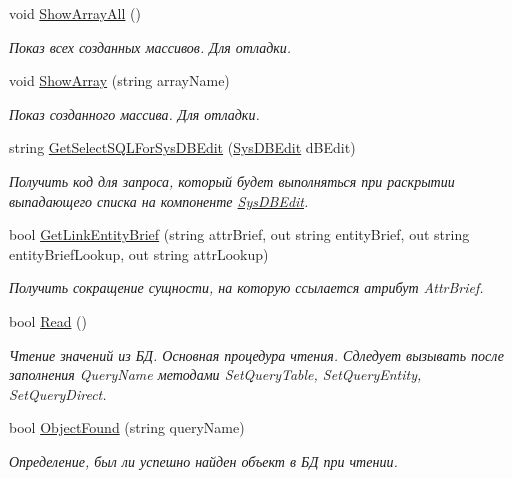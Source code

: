 \begin{DoxyCompactItemize}
void \mbox{\hyperlink{class_f_b_a_1_1_object_ref_a6fb31073d09c76073f332b1717eaa465}{Show\+Array\+All}} ()
\begin{DoxyCompactList}\small\item\em Показ всех созданных массивов. Для отладки. \end{DoxyCompactList}\item 
void \mbox{\hyperlink{class_f_b_a_1_1_object_ref_a9985e9852c812e075a1caccbc7c6d645}{Show\+Array}} (string array\+Name)
\begin{DoxyCompactList}\small\item\em Показ созданного массива. Для отладки. \end{DoxyCompactList}\item 
string \mbox{\hyperlink{class_f_b_a_1_1_object_ref_a6287de4b88ed43911676ca8e585fc925}{Get\+Select\+S\+Q\+L\+For\+Sys\+D\+B\+Edit}} (\mbox{\hyperlink{class_f_b_a_1_1_sys_d_b_edit}{Sys\+D\+B\+Edit}} d\+B\+Edit)
\begin{DoxyCompactList}\small\item\em Получить код для запроса, который будет выполняться при раскрытии выпадающего списка на компоненте \mbox{\hyperlink{class_f_b_a_1_1_sys_d_b_edit}{Sys\+D\+B\+Edit}}. \end{DoxyCompactList}\item 
bool \mbox{\hyperlink{class_f_b_a_1_1_object_ref_a9ebdd2175dafe9fdfa2f20214ce4f757}{Get\+Link\+Entity\+Brief}} (string attr\+Brief, out string entity\+Brief, out string entity\+Brief\+Lookup, out string attr\+Lookup)
\begin{DoxyCompactList}\small\item\em Получить сокращение сущности, на которую ссылается атрибут Attr\+Brief. \end{DoxyCompactList}\item 
bool \mbox{\hyperlink{class_f_b_a_1_1_object_ref_a58332d6e16861b5db182d3ceb58bbe02}{Read}} ()
\begin{DoxyCompactList}\small\item\em Чтение значений из БД. Основная процедура чтения. Сдледует вызывать после заполнения Query\+Name методами Set\+Query\+Table, Set\+Query\+Entity, Set\+Query\+Direct. \end{DoxyCompactList}\item 
bool \mbox{\hyperlink{class_f_b_a_1_1_object_ref_a1027bbbceec20212701d6e3a49476a4c}{Object\+Found}} (string query\+Name)
\begin{DoxyCompactList}\small\item\em Определение, был ли успешно найден объект в БД при чтении. \end{DoxyCompactList}\item 

\end{DoxyCompactItemize}
